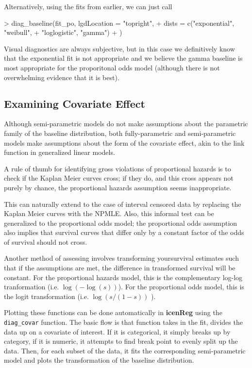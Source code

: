 \documentclass[a4paper]{article}
\begin{document}
Alternatively, using the fits from earlier, we can just call
  
\begin{Schunk}
\begin{Sinput}
> diag_baseline(fit_po, lgdLocation = "topright",
+               dists = c("exponential", "weibull", 
+                         "loglogistic", "gamma")
+               )
\end{Sinput}
\end{Schunk}

Visual diagnostics are always subjective, but in this case we definitively know that the exponential fit is not appropriate and we believe the gamma baseline is most appropriate for the proporitonal odds model (although there is not overwhelming evidence that it is best). 
  
\subsection{Examining Covariate Effect}
  
Although semi-parametric models do not make assumptions about the parametric family of the baseline distribution, both fully-parametric and semi-parametric models make assumptions about the form of the covariate effect, akin to the link function in generalized linear models. 
  
A rule of thumb for identifying gross violations of proportional hazards is to check if the Kaplan Meier curves cross; if they do, and this cross appears not purely by chance, the proportional hazards assumption seems inappropriate. 
  
This can naturally extend to the case of interval censored data by replacing the Kaplan Meier curves with the NPMLE. Also, this informal test can be generalized to the proportional odds model; the proportional odds assumption also implies that survival curves that differ only by a constant factor of the odds of survival should not cross. 
  
Another method of assessing involves transforming yoursurvival estimates such that if the assumptions are met, the difference in transformed survival will be constant. For the proportional hazards model, this is the complementary log-log tranformation (i.e. $\log (-\log(s) )$). For the proportional odds model, this is the logit transformation (i.e. $\log(s/(1-s))$ ).
  
Plotting these functions can be done automatically in {\bf icenReg} using the \texttt{diag\_covar} function. The basic flow is that function takes in the fit, divides the data up on a covariate of interest. If it is categorical, it simply breaks up by category, if it is numeric, it attempts to find break point to evenly split up the data. Then, for each subset of the data, it fits the corresponding semi-parametric model and plots the transformation of the baseline distribution. 
 
\end{document}
